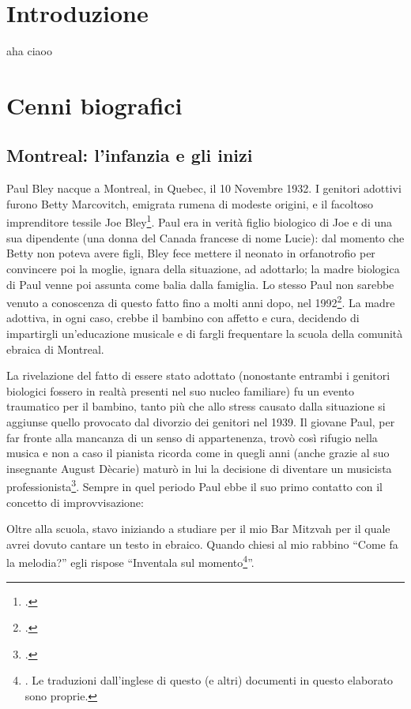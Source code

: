 \frontmatter
\setcounter{page}{1}
\tableofcontents
\chapter{Introduzione}
aha ciaoo
\mainmatter
\setcounter{page}{1}
\pagestyle{fancy}
\makeatletter
\let\ps@plain\ps@fancy
\makeatother
\chapter{Cenni biografici}
\section{Montreal: l'infanzia e gli inizi}
Paul Bley nacque a Montreal, in Quebec, il 10 Novembre 1932. I genitori adottivi furono Betty Marcovitch, emigrata rumena di modeste origini, e il facoltoso imprenditore tessile Joe Bley\footcite[10]{stopping}. Paul era in verità figlio biologico di Joe e di una sua dipendente (una donna del Canada francese di nome Lucie): dal momento che Betty non poteva avere figli, Bley fece mettere il neonato in orfanotrofio per convincere poi la moglie, ignara della situazione, ad adottarlo; la madre biologica di Paul venne poi assunta come balia dalla famiglia. Lo stesso Paul non sarebbe venuto a conoscenza di questo fatto fino a molti anni dopo, nel 1992\footcite[13]{stopping}. La madre adottiva, in ogni caso, crebbe il bambino con affetto e cura, decidendo di impartirgli un'educazione musicale e di fargli frequentare la scuola della comunità ebraica di Montreal.\par
La rivelazione del fatto di essere stato adottato (nonostante entrambi i genitori biologici fossero in realtà presenti nel suo nucleo familiare) fu un evento traumatico per il bambino, tanto più che allo stress causato dalla situazione si aggiunse quello provocato dal divorzio dei genitori nel 1939. Il giovane Paul, per far fronte alla mancanza di un senso di appartenenza, trovò così rifugio nella musica e non a caso il pianista ricorda come in quegli anni (anche grazie al suo insegnante August Dècarie) maturò in lui la decisione di diventare un musicista professionista\footcite[15]{stopping}. Sempre in quel periodo Paul ebbe il suo primo contatto con il concetto di improvvisazione:
\begin{fquote}
	Oltre alla scuola, stavo iniziando a studiare per il mio Bar Mitzvah per il quale avrei dovuto cantare un testo in ebraico. Quando chiesi al mio rabbino ``Come fa la melodia?'' egli rispose ``Inventala sul momento\footnote{\cite[16]{stopping}. Le traduzioni dall'inglese di questo (e altri) documenti in questo elaborato sono proprie.}''.
\end{fquote}
